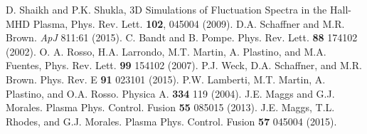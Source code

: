 \documentclass[aip,pop,amsmath,amssymb,preprint,superscriptaddress]{revtex4-1} %
\begin{document}
\begin{thebibliography}{10}
 D. Shaikh and P.K. Shukla, 3D Simulations of Fluctuation Spectra in the Hall-MHD Plasma, Phys. Rev. Lett. {\bf 102}, 045004 (2009).
 D.A. Schaffner and M.R. Brown. {\it ApJ} 811:61 (2015).
 C. Bandt and B. Pompe. Phys. Rev. Lett. {\bf 88} 174102 (2002).
 O. A. Rosso, H.A. Larrondo, M.T. Martin, A. Plastino, and M.A. Fuentes, Phys. Rev. Lett. {\bf 99} 154102 (2007).
 P.J. Weck, D.A. Schaffner, and M.R. Brown. Phys. Rev. E {\bf 91} 023101 (2015).
 P.W. Lamberti, M.T. Martin, A. Plastino, and O.A. Rosso. Physica A. {\bf 334} 119 (2004).
 J.E. Maggs and G.J. Morales. Plasma Phys. Control. Fusion {\bf 55} 085015 (2013).
 J.E. Maggs, T.L. Rhodes, and G.J. Morales. Plasma Phys. Control. Fusion {\bf 57}  045004 (2015).

\end{thebibliography}
\end{document}
